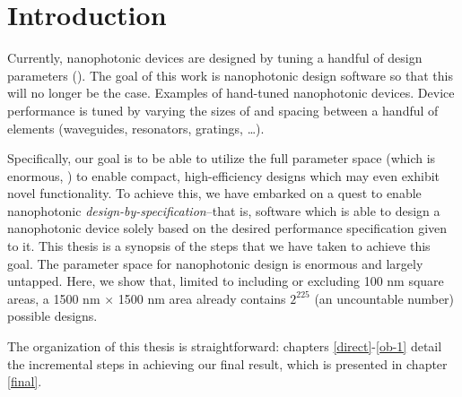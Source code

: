 \chapter{Introduction}
Currently, nanophotonic devices are designed by tuning
    a handful of design parameters ().
The goal of this work is nanophotonic design software
    so that this will no longer be the case.
    {Examples of hand-tuned nanophotonic devices.
    Device performance is tuned by varying the sizes of and spacing between
    a handful of elements (waveguides, resonators, gratings, \ldots).}

Specifically, our goal is to be able to utilize the full parameter space
    (which is enormous, )
    to enable compact, high-efficiency designs
    which may even exhibit novel functionality.
To achieve this, we have embarked on a quest 
    to enable nanophotonic \emph{design-by-specification}--that is,
    software which is able to design a nanophotonic device
    solely based on the desired performance specification given to it.
This thesis is a synopsis of the steps that we have taken to achieve this goal.
    {The parameter space for nanophotonic design is enormous and largely untapped.
    Here, we show that, 
        limited to including or excluding 100 nm square areas,
        a 1500 nm $\times$ 1500 nm area already contains $2^{225}$ 
        (an uncountable number) possible designs.}

The organization of this thesis is straightforward: 
    chapters \ref{direct}-\ref{ob-1} detail the incremental steps in achieving
    our final result, which is presented in chapter \ref{final}.

